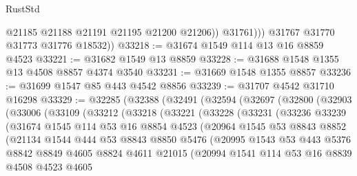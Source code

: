 \begin{lexlean}{RustStd}
\begin{coremodule}
                  @21185
                  @21188
                  @21191
                  @21195
                  @21200
                  @21206))
              @31761)))
        @31767
        @31770
        @31773
        @31776
        @18532))
@33218 := @31674 @1549 @114 @13 @16 @8859 @4523
@33221 := @31682 @1549 @13 @8859
@33228 := @31688 @1548 @1355 @13 @4508 @8857 @4374 @3540
@33231 := @31669 @1548 @1355 @8857
@33236 := @31699 @1547 @85 @443 @4542 @8856
@33239 := @31707 @4542 @31710 @16298
@33329 := @32285
    (@32388
      (@32491
        (@32594
          (@32697
            (@32800
              (@32903
                (@33006
                  (@33109
                    (@33212
                      (@33218
                        (@33221
                          (@33228
                            (@33231
                              (@33236
                                @33239
                                (@31674
                                  @1545
                                  @114
                                  @53
                                  @16
                                  @8854
                                  @4523
                                  (@20964
                                    @1545
                                    @53
                                    @8843
                                    @8852
                                    (@21134
                                      @1544
                                      @444
                                      @53
                                      @8843
                                      @8850
                                      @5476
                                      (@20995
                                        @1543
                                        @53
                                        @443
                                        @5376
                                        @8842
                                        @8849
                                        @4605
                                        @8824
                                        @4611
                                        @21015
                                        (@20994
                                          @1541
                                          @114
                                          @53
                                          @16
                                          @8839
                                          @4508
                                          @4523
                                          @4605

\end{coremodule}
\end{lexlean}
